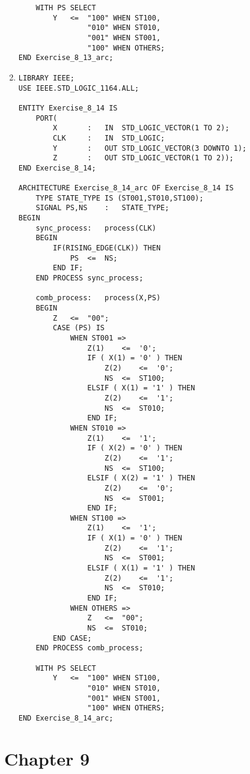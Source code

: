 \begin{enumerate}
\begin{lstlisting}
	WITH PS SELECT
		Y	<=	"100" WHEN ST100,
				"010" WHEN ST010,
				"001" WHEN ST001,
				"100" WHEN OTHERS;
END Exercise_8_13_arc;
	\end{lstlisting}

	\item \begin{lstlisting}
LIBRARY IEEE;
USE IEEE.STD_LOGIC_1164.ALL;

ENTITY Exercise_8_14 IS
	PORT(
		X		:	IN	STD_LOGIC_VECTOR(1 TO 2);
		CLK		:	IN	STD_LOGIC;
		Y		:	OUT	STD_LOGIC_VECTOR(3 DOWNTO 1);
		Z		:	OUT	STD_LOGIC_VECTOR(1 TO 2));
END Exercise_8_14;

ARCHITECTURE Exercise_8_14_arc OF Exercise_8_14 IS
	TYPE STATE_TYPE IS (ST001,ST010,ST100);
	SIGNAL PS,NS	:	STATE_TYPE;
BEGIN
	sync_process:	process(CLK) 
	BEGIN
		IF(RISING_EDGE(CLK)) THEN
			PS	<=	NS;
		END IF;
	END PROCESS sync_process;

	comb_process:	process(X,PS) 
	BEGIN
		Z	<=	"00";
		CASE (PS) IS
			WHEN ST001 =>
				Z(1)	<=	'0';
				IF ( X(1) = '0' ) THEN
					Z(2)	<=	'0';
					NS	<=	ST100;
				ELSIF ( X(1) = '1' ) THEN
					Z(2)	<=	'1';
					NS	<=	ST010;
				END IF;
			WHEN ST010 =>
				Z(1)	<=	'1';
				IF ( X(2) = '0' ) THEN
					Z(2)	<=	'1';
					NS	<=	ST100;
				ELSIF ( X(2) = '1' ) THEN
					Z(2)	<=	'0';
					NS	<=	ST001;
				END IF;
			WHEN ST100 =>
				Z(1)	<=	'1';
				IF ( X(1) = '0' ) THEN
					Z(2)	<=	'1';
					NS	<=	ST001;
				ELSIF ( X(1) = '1' ) THEN
					Z(2)	<=	'1';
					NS	<=	ST010;
				END IF;
			WHEN OTHERS =>
				Z	<=	"00";
				NS	<=	ST010;
		END CASE;
	END PROCESS comb_process;

	WITH PS SELECT
		Y	<=	"100" WHEN ST100,
				"010" WHEN ST010,
				"001" WHEN ST001,
				"100" WHEN OTHERS;
END Exercise_8_14_arc;
	\end{lstlisting}
\end{enumerate}

\section*{Chapter 9}

